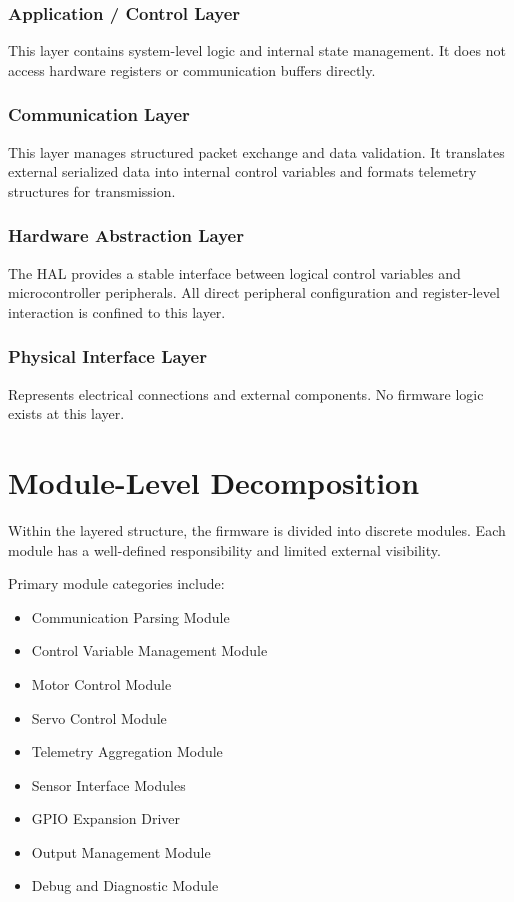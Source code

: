 \subsubsection*{Application / Control Layer}

This layer contains system-level logic and internal state management.  
It does not access hardware registers or communication buffers directly.

\subsubsection*{Communication Layer}

This layer manages structured packet exchange and data validation.  
It translates external serialized data into internal control variables and formats telemetry structures for transmission.

\subsubsection*{Hardware Abstraction Layer}

The HAL provides a stable interface between logical control variables and microcontroller peripherals.  
All direct peripheral configuration and register-level interaction is confined to this layer.

\subsubsection*{Physical Interface Layer}

Represents electrical connections and external components.  
No firmware logic exists at this layer.


\section{Module-Level Decomposition}

Within the layered structure, the firmware is divided into discrete modules.  
Each module has a well-defined responsibility and limited external visibility.

Primary module categories include:

\begin{itemize}
	\item Communication Parsing Module
	\item Control Variable Management Module
	\item Motor Control Module
	\item Servo Control Module
	\item Telemetry Aggregation Module
	\item Sensor Interface Modules
	\item GPIO Expansion Driver
	\item Output Management Module
	\item Debug and Diagnostic Module
\end{itemize}

